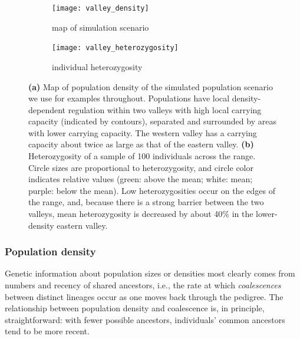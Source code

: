 \documentclass{ar-1col}
\renewcommand{\emph}[1]{{\textit{#1}}}
\begin{document}
\begin{figure}	%
    \centering
    \begin{subfigure}{0.95\textwidth}
        \centering
        \texttt{[image: valley\_density]}
        \caption{map of simulation scenario}
        \label{valley_map}
    \end{subfigure}
    \begin{subfigure}{0.95\textwidth}
        \centering
        \texttt{[image: valley\_heterozygosity]}
        \caption{individual heterozygosity}
        \label{valley_het}
    \end{subfigure}
        \caption{
            \textbf{(a)} Map of population density of the simulated population scenario
            we use for examples throughout.
            Populations have local density-dependent regulation
            within two valleys with high local carrying capacity (indicated by contours),
            separated and surrounded by areas with lower carrying capacity.
            The western valley has a carrying capacity about twice as large as that of the eastern valley.
            \textbf{(b)} Heterozygosity of a sample of 100 individuals across the range.
            Circle sizes are proportional to heterozygosity,
            and circle color indicates relative values
            (green: above the mean; white: mean; purple: below the mean).
            Low heterozygosities occur on the edges of the range,
            and, because there is a strong barrier between the two valleys,
            mean heterozygosity is decreased by about 40\% in the lower-density eastern valley.
		}
        \label{pop_density}
\end{figure}



\subsubsection{Population density}

Genetic information about population sizes or densities most clearly
comes from numbers and recency of shared ancestors, 
i.e., the rate at which \emph{coalescences} between distinct lineages
occur as one moves back through the pedigree.
The relationship between population density and coalescence is, in principle, straightforward:
with fewer possible ancestors,
individuals' common ancestors tend to be more recent.
\end{document}
